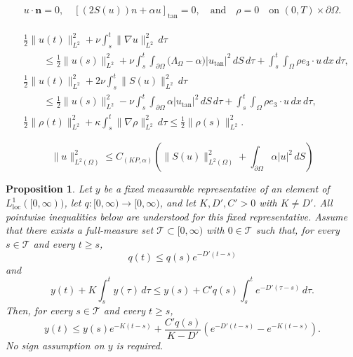 \documentclass[10pt,a4paper]{amsart}
\newtheorem{proposition}{Proposition}
\newcommand{\navierbc}{\left[(2S({u}))\nn + \alpha {u}\right]_{\tanproj} = 0}
\newcommand{\nn}{{n}}
\newcommand{\tanproj}{\text{tan}}
\begin{document}
\begin{align}
    {u} \cdot \mathbf n = 0, \quad \navierbc, \quad \text{and} \quad \rho = 0 \quad \text{on } (0, T) \times \partial\Omega. \label{eq:navier_bc}
\end{align}

\begin{align}
&\frac{1}{2}\|u(t)\|_{L^2}^2
  + \nu \int_s^t \|\nabla u\|_{L^2}^2\,d\tau
\nonumber \\
&\qquad \leq
  \frac{1}{2}\|u(s)\|_{L^2}^2
  +\nu\int_s^t \int_{\partial\Omega}
  \bigl(\Lambda_\Omega-\alpha\bigr)
  |u_{\tanproj}|^2\,dS\,d\tau
  +\int_s^t\int_\Omega \rho e_3\cdot u\,dx\,d\tau,\label{eq:energy_ineq1}
\\[0.5em]
&\frac{1}{2}\|u(t)\|_{L^2}^2
  +2\nu\int_s^t\|S(u)\|_{L^2}^2\,d\tau
\nonumber \\
&\qquad \leq
  \frac{1}{2}\|u(s)\|_{L^2}^2
  -\nu\int_s^t\int_{\partial\Omega}
  \alpha|u_{\tanproj}|^2 \, dS \, d\tau
  +\int_s^t\int_\Omega \rho e_3\cdot u\,dx\,d\tau,\label{eq:energy_ineq2}
\\[0.5em]
&\frac{1}{2}\|\rho(t)\|_{L^2}^2
  +\kappa\int_s^t\|\nabla\rho\|_{L^2}^2\,d\tau\leq\frac{1}{2}\|\rho(s)\|_{L^2}^2.\label{eq:rho_energy_ineq}
\end{align}

\begin{equation}\label{kornpoincare2}
\|u\|^2_{L^2(\Omega)}\le C_{(KP,\alpha)}\left(\|S(u)\|_{L^2(\Omega)}^2+\int_{\partial\Omega}\alpha|u|^2\,dS\right)
\end{equation}

\begin{proposition}\label{AppendixA}
Let {$y$ be a fixed measurable representative of an
element of \(L^1_{\mathrm{loc}}([0,\infty))\)}, let
$q:[0,\infty)\to[0,\infty)$, and let $K,D',C'>0$ with $K\neq D'$.
{All pointwise inequalities below are understood for this
fixed representative.} Assume that there exists a full-measure set $\mathcal T\subset[0,\infty)$ with $0\in\mathcal T$ such that, for every $s\in\mathcal T$ and every $t\ge s$,
\begin{equation}\label{Aq}
q(t)\le q(s)e^{-D'(t-s)}
\end{equation}
and
\begin{equation}\label{A1}
y(t)+K\int_s^t y(\tau)\,d\tau
\le y(s)+C'q(s)\int_s^t e^{-D'(\tau-s)}\,d\tau.
\end{equation}
Then, for every $s\in\mathcal T$ and every $t\ge s$,
\begin{equation}\label{A2}
y(t)\le y(s)e^{-K(t-s)}+\frac{C'q(s)}{K-D'}\left(e^{-D'(t-s)}-e^{-K(t-s)}\right).
\end{equation}
No sign assumption on $y$ is required.
\end{proposition}
\end{document}
